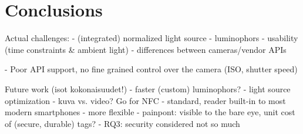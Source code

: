 \documentclass[thesis.tex]{subfiles}
\begin{document}
\chapter{Conclusions}
\label{chapter:conclusions}

Actual challenges:
- (integrated) normalized light source
- luminophors
- usability (time constraints \& ambient light)
- differences between cameras/vendor APIs

- Poor API support, no fine grained control over the camera (ISO, shutter speed)

Future work (isot kokonaisuudet!)
  - faster (custom) luminophors?
  - light source optimization
  - kuva vs. video?
Go for NFC
- standard, reader built-in to most modern smartphones
- more flexible
- painpont: visible to the bare eye, unit cost of (secure, durable) tags?
- RQ3: security considered not so much
\end{document}
